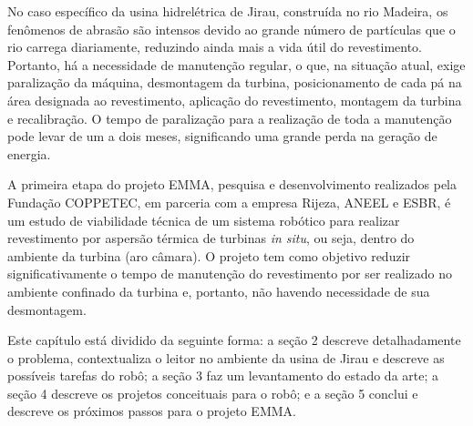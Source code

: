No caso específico da usina hidrelétrica de Jirau, construída no rio Madeira,
os fenômenos de abrasão são intensos devido ao grande número
de partículas que o rio carrega diariamente, reduzindo ainda mais a vida útil do
revestimento.
Portanto, há a necessidade de manutenção regular, o que, na situação atual,
exige paralização da máquina, desmontagem da turbina, posicionamento de cada pá
na área designada ao revestimento, aplicação do revestimento, montagem da
turbina e recalibração. O tempo de paralização para a realização de
toda a manutenção pode levar de um a dois meses, significando uma grande perda
na geração de energia. 

A primeira etapa do projeto EMMA, pesquisa e desenvolvimento
realizados pela Fundação COPPETEC, em parceria com a empresa Rijeza, ANEEL e
ESBR, é um estudo de viabilidade técnica de um sistema robótico para realizar
revestimento por aspersão térmica de turbinas \textit{in situ}, ou seja, dentro
do ambiente da turbina (aro câmara). O projeto tem como objetivo reduzir
significativamente o tempo de manutenção do revestimento por ser realizado no
ambiente confinado da turbina e, portanto, não havendo necessidade de sua
desmontagem.

Este capítulo está dividido da seguinte forma: a seção 2 descreve
detalhadamente o problema, contextualiza o leitor no ambiente da usina de
Jirau e descreve as possíveis tarefas do robô; a seção 3 faz um levantamento do
estado da arte; a seção 4 descreve os projetos conceituais para o robô; e a
seção 5 conclui e descreve os próximos passos para o projeto EMMA. 



